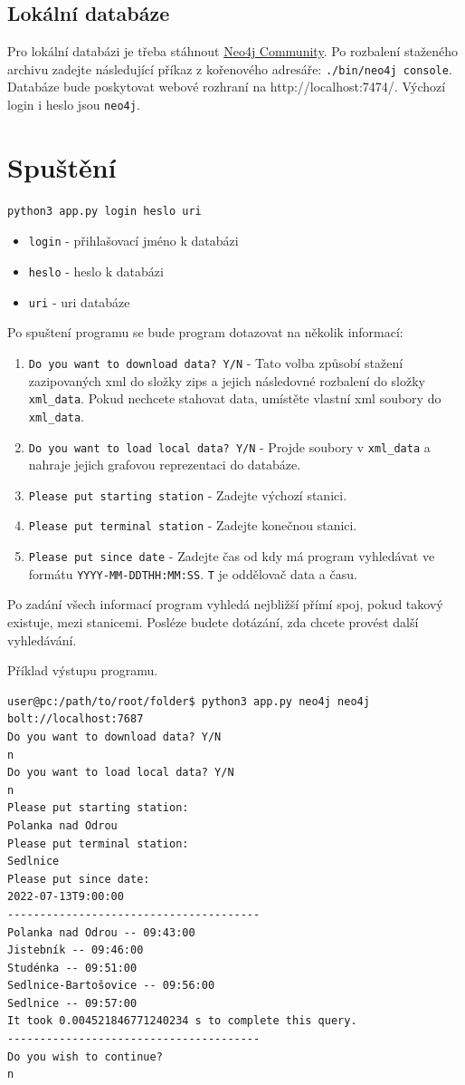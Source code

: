 \documentclass[10pt,xcolor=pdflatex,dvipsnames,table,oneside]{book}
\begin{document}
\subsection{Lokální databáze}
Pro lokální databázi je třeba stáhnout \href{https://neo4j.com/download-center/#community}{Neo4j Community}.
Po rozbalení staženého archivu zadejte následující příkaz z kořenového adresáře: \verb|./bin/neo4j console|.
Databáze bude poskytovat webové rozhraní na http://localhost:7474/. Výchozí login i heslo jsou \verb|neo4j|.

\section{Spuštění}
\begin{verbatim}
python3 app.py login heslo uri
\end{verbatim}
\begin{itemize}
    \item \verb|login| - přihlašovací jméno k databázi
    \item \verb|heslo| - heslo k databázi
    \item \verb|uri| - uri databáze
\end{itemize}
Po spuštení programu se bude program dotazovat na několik informací:
\begin{enumerate}
    \item \verb|Do you want to download data? Y/N| - Tato volba způsobí stažení zazipovaných xml do
    složky zips a jejich následovné rozbalení do složky \verb|xml_data|. Pokud nechcete stahovat data,
    umístěte vlastní xml soubory do \verb|xml_data|.
    \item \verb|Do you want to load local data? Y/N| - Projde soubory v \verb|xml_data| a nahraje jejich grafovou
    reprezentaci do databáze.
    \item \verb|Please put starting station| - Zadejte výchozí stanici.
    \item \verb|Please put terminal station| - Zadejte konečnou stanici.
    \item \verb|Please put since date| - Zadejte čas od kdy má program vyhledávat ve formátu \verb|YYYY-MM-DDTHH:MM:SS|. \verb|T| je oddělovač data a času.
\end{enumerate}
Po zadání všech informací program vyhledá nejbližší přímí spoj, pokud takový existuje, mezi stanicemi.
Posléze budete dotázání, zda chcete provést další vyhledávání.

\vspace{1em}
Příklad výstupu programu.
\begin{verbatim}
user@pc:/path/to/root/folder$ python3 app.py neo4j neo4j bolt://localhost:7687
Do you want to download data? Y/N
n
Do you want to load local data? Y/N
n
Please put starting station:
Polanka nad Odrou
Please put terminal station:
Sedlnice
Please put since date:
2022-07-13T9:00:00   
---------------------------------------
Polanka nad Odrou -- 09:43:00
Jistebník -- 09:46:00
Studénka -- 09:51:00
Sedlnice-Bartošovice -- 09:56:00
Sedlnice -- 09:57:00
It took 0.004521846771240234 s to complete this query.
---------------------------------------
Do you wish to continue?
n    
\end{verbatim}
\end{document}
